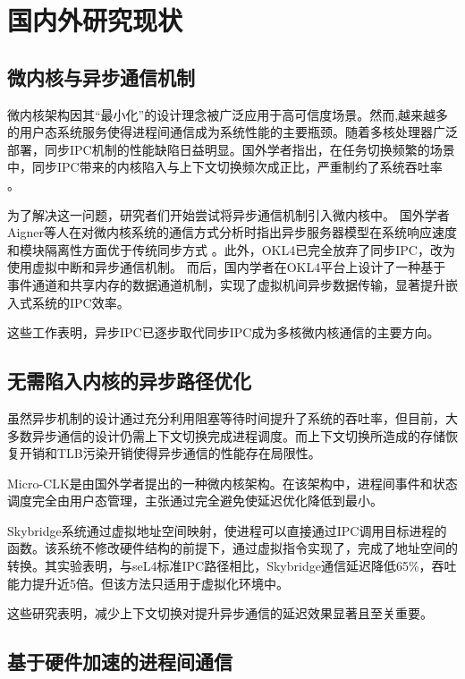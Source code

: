 \section{国内外研究现状}

\subsection{微内核与异步通信机制}

微内核架构因其“最小化”的设计理念被广泛应用于高可信度场景\cite{liedtke}。然而,越来越多的用户态系统服务使得进程间通信成为系统性能的主要瓶颈。随着多核处理器广泛部署，同步IPC机制的性能缺陷日益明显。国外学者指出，在任务切换频繁的场景中，同步IPC带来的内核陷入与上下文切换频次成正比，严重制约了系统吞吐率 \cite{reichmann2015ipcperformance}。

为了解决这一问题，研究者们开始尝试将异步通信机制引入微内核中。
国外学者Aigner等人在对微内核系统的通信方式分析时指出异步服务器模型在系统响应速度和模块隔离性方面优于传统同步方式 \cite{2011Communication}。此外，OKL4已完全放弃了同步IPC，改为使用虚拟中断和异步通信机制\cite{varanasi2010okl4}。
而后，国内学者在OKL4平台上设计了一种基于事件通道和共享内存的数据通道机制，实现了虚拟机间异步数据传输，显著提升嵌入式系统的IPC效率\cite{wang2017efficient}。

这些工作表明，异步IPC已逐步取代同步IPC成为多核微内核通信的主要方向。

\subsection{无需陷入内核的异步路径优化}

虽然异步机制的设计通过充分利用阻塞等待时间提升了系统的吞吐率，但目前，大多数异步通信的设计仍需上下文切换完成进程调度。而上下文切换所造成的存储恢复开销和TLB污染开销使得异步通信的性能存在局限性。

Micro-CLK是由国外学者提出的一种微内核架构。在该架构中，进程间事件和状态调度完全由用户态管理，主张通过完全避免使延迟优化降低到最小\cite{Klimiankou2021microclk}。

Skybridge系统\cite{2019SkyBridge}通过虚拟地址空间映射，使进程可以直接通过IPC调用目标进程的函数。该系统不修改硬件结构的前提下，通过虚拟指令实现了，完成了地址空间的转换。其实验表明，与seL4标准IPC路径相比，Skybridge通信延迟降低65\%，吞吐能力提升近5倍。但该方法只适用于虚拟化环境中。

这些研究表明，减少上下文切换对提升异步通信的延迟效果显著且至关重要。

\subsection{基于硬件加速的进程间通信}

